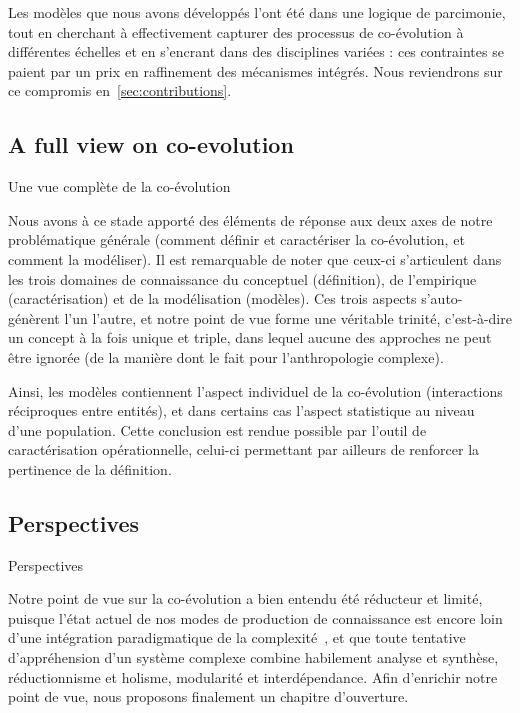 Les modèles que nous avons développés l'ont été dans une logique de parcimonie, tout en cherchant à effectivement capturer des processus de co-évolution à différentes échelles et en s'encrant dans des disciplines variées : ces contraintes se paient par un prix en raffinement des mécanismes intégrés. Nous reviendrons sur ce compromis en~\ref{sec:contributions}.

\subsection*{A full view on co-evolution}{Une vue complète de la co-évolution}


Nous avons à ce stade apporté des éléments de réponse aux deux axes de notre problématique générale (comment définir et caractériser la co-évolution, et comment la modéliser). Il est remarquable de noter que ceux-ci s'articulent dans les trois domaines de connaissance du conceptuel (définition), de l'empirique (caractérisation) et de la modélisation (modèles). Ces trois aspects s'auto-génèrent l'un l'autre, et notre point de vue forme une véritable trinité, c'est-à-dire un concept à la fois unique et triple, dans lequel aucune des approches ne peut être ignorée (de la manière dont le fait \cite{morin2001methode} pour l'anthropologie complexe).

Ainsi, les modèles contiennent l'aspect individuel de la co-évolution (interactions réciproques entre entités), et dans certains cas l'aspect statistique au niveau d'une population. Cette conclusion est rendue possible par l'outil de caractérisation opérationnelle, celui-ci permettant par ailleurs de renforcer la pertinence de la définition.




\subsection*{Perspectives}{Perspectives}

Notre point de vue sur la co-évolution a bien entendu été réducteur et limité, puisque l'état actuel de nos modes de production de connaissance est encore loin d'une intégration paradigmatique de la complexité~\cite{morin1991methode}, et que toute tentative d'appréhension d'un système complexe combine habilement analyse et synthèse, réductionnisme et holisme, modularité et interdépendance. Afin d'enrichir notre point de vue, nous proposons finalement un chapitre d'ouverture.









